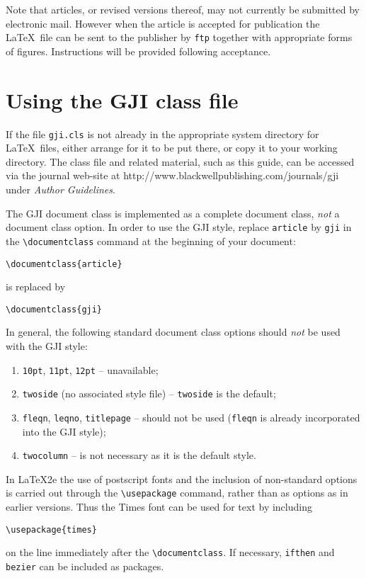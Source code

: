 \documentclass{gji}
\begin{document}
Note that articles, or revised versions thereof, may not currently be
submitted by electronic mail. However when the article is accepted for
publication the \LaTeX\ file can be sent to the publisher by \verb"ftp"
together with appropriate forms of figures.  Instructions will be provided
following acceptance.

\section{Using the GJI class file}

If the file \verb"gji.cls" is not already in the appropriate
system directory for \LaTeX\ files, either arrange for it to be
put there, or copy it to your working directory. The class file
and related material, such as this guide, can be accessed via the
journal web-site  at
http://www.blackwellpublishing.com/journals/gji under {\em Author
Guidelines}.

The GJI document class is implemented as a complete document class, {\em
not\/} a document class option. In   order to use the GJI style, replace
\verb"article" by
\verb"gji" in the
\verb"\documentclass" command at the beginning of your document:
\begin{verbatim}
\documentclass{article}
\end{verbatim}
is replaced by
\begin{verbatim}
\documentclass{gji}
\end{verbatim}
In general, the following standard document class options should {\em
not\/} be used with the GJI style:
\begin{enumerate}
  \item \texttt{10pt}, \texttt{11pt}, \texttt{12pt} -- unavailable;
  \item \texttt{twoside} (no associated style file) --
     \texttt{twoside} is the default;
  \item \texttt{fleqn}, \texttt{leqno}, \texttt{titlepage} --
        should not be used (\verb"fleqn" is already incorporated into
        the GJI style);
  \item \texttt{twocolumn} -- is not necessary as it is the default style.
\end{enumerate}

In \LaTeX2e the use of postscript fonts and the inclusion of non-standard
options is carried out through the \verb"\usepackage" command, rather than
as options as in earlier versions.  Thus the Times font can be used for
text by including
\begin{verbatim}
\usepackage{times}
\end{verbatim}
on the line immediately after the \verb"\documentclass". If necessary,
\texttt{ifthen} and \texttt{bezier} can be included as packages.
\end{document}
